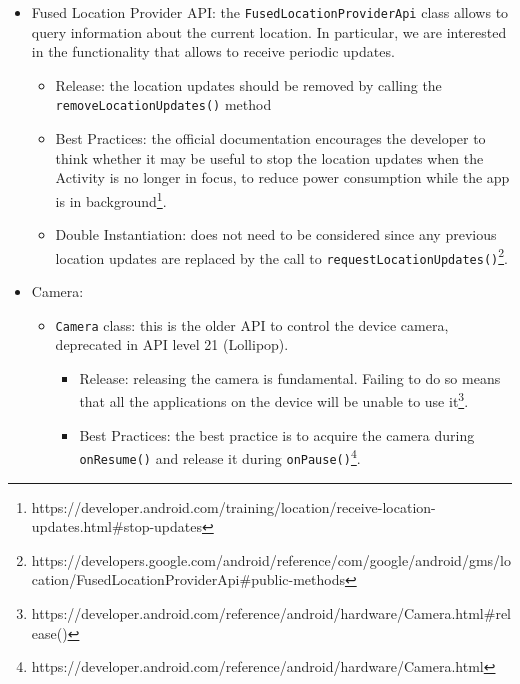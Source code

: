 \documentclass[11pt,a4paper,notitlepage]{article}
\begin{document}
\begin{itemize}
\begin{itemize}
		\item Best Practices: the official recommendation is to connect during \texttt{onStart()} and to disconnect during \texttt{onStop()}\footnote{https://developers.google.com/android/guides/api-client\#start\_a\_manually\_managed\_connection}
		\item Double Instantiation: it is not a problem since the call to \texttt{connect()} returns immediately if the client is already connected or connecting\footnote{https://developers.google.com/android/reference/com/google/android/gms/common/api/GoogleApiClient\#public-methods}.
	\end{itemize}
	\item Fused Location Provider API: the \texttt{FusedLocationProviderApi} class allows to query information about the current location. In particular, we are interested in the functionality that allows to receive periodic updates.
	\begin{itemize}
		\item Release: the location updates should be removed by calling the \texttt{removeLocationUpdates()} method
		\item Best Practices: the official documentation encourages the developer to think whether it may be useful to stop the location updates when the Activity is no longer in focus, to reduce power consumption while the app is in background\footnote{https://developer.android.com/training/location/receive-location-updates.html\#stop-updates}.
		\item Double Instantiation: does not need to be considered since any previous location updates are replaced by the call to \texttt{requestLocationUpdates()}\footnote{https://developers.google.com/android/reference/com/google/android/gms/location/FusedLocationProviderApi\#public-methods}.
	\end{itemize}
	\item Camera:
		\begin{itemize}
			\item \texttt{Camera} class: this is the older API to control the device camera, deprecated in API level 21 (Lollipop).
			\begin{itemize}
				\item Release: releasing the camera is fundamental. Failing to do so means that all the applications on the device will be unable to use it\footnote{https://developer.android.com/reference/android/hardware/Camera.html\#release()}.
				\item Best Practices: the best practice is to acquire the camera during \texttt{onResume()} and release it during \texttt{onPause()}\footnote{https://developer.android.com/reference/android/hardware/Camera.html}.

\end{itemize}
\end{itemize}
\end{itemize}
\end{document}
